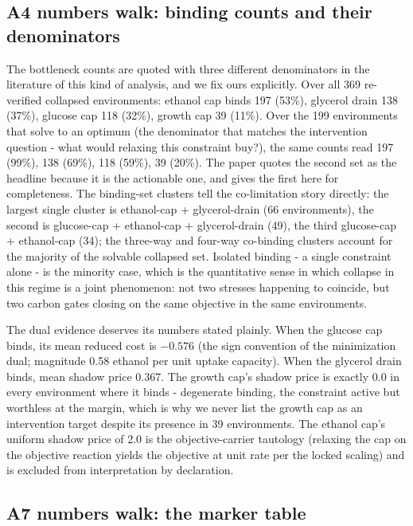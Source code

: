 \documentclass[12pt]{article}
\begin{document}
\subsection{A4 numbers walk: binding counts and their denominators}

The bottleneck counts are quoted with three different denominators in
the literature of this kind of analysis, and we fix ours explicitly.
Over all 369 re-verified collapsed environments: ethanol cap binds
197 (53\%), glycerol drain 138 (37\%), glucose cap 118 (32\%), growth
cap 39 (11\%). Over the 199 environments that solve to an optimum
(the denominator that matches the intervention question - what would
relaxing this constraint buy?), the same counts read 197 (99\%), 138
(69\%), 118 (59\%), 39 (20\%). The paper quotes the second set as the
headline because it is the actionable one, and gives the first here
for completeness. The binding-set clusters tell the co-limitation
story directly: the largest single cluster is ethanol-cap +
glycerol-drain (66 environments), the second is glucose-cap +
ethanol-cap + glycerol-drain (49), the third glucose-cap +
ethanol-cap (34); the three-way and four-way co-binding clusters
account for the majority of the solvable collapsed set. Isolated
binding - a single constraint alone - is the minority case, which is
the quantitative sense in which collapse in this regime is a joint
phenomenon: not two stresses happening to coincide, but two carbon
gates closing on the same objective in the same environments.

The dual evidence deserves its numbers stated plainly. When the
glucose cap binds, its mean reduced cost is $-0.576$ (the sign
convention of the minimization dual; magnitude 0.58 ethanol per unit
uptake capacity). When the glycerol drain binds, mean shadow price
0.367. The growth cap's shadow price is exactly 0.0 in every
environment where it binds - degenerate binding, the constraint
active but worthless at the margin, which is why we never list the
growth cap as an intervention target despite its presence in 39
environments. The ethanol cap's uniform shadow price of 2.0 is the
objective-carrier tautology (relaxing the cap on the objective
reaction yields the objective at unit rate per the locked scaling)
and is excluded from interpretation by declaration.

\subsection{A7 numbers walk: the marker table}
\end{document}
